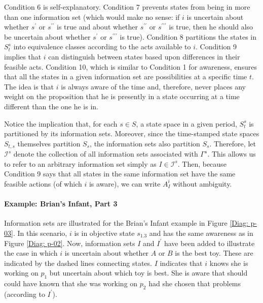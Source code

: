 \documentclass[
11pt,
titlepage,
reqno,
]{article}%
\theoremstyle{definition}
\begin{document}
Condition 6 is self-explanatory. 
Condition 7 prevents states from being in more than one information set (which would make no sense: if $i$ is uncertain about whether $s^{\prime}$ or $s^{\prime\prime}$ is true and about whether $s^{\prime\prime}$ or $s^{\prime\prime\prime}$ is true, then he should also be uncertain about whether $s^{\prime}$ or $s^{\prime\prime\prime}$ is true).
Condition 8  partitions the states in $S^s_{t}$ into equivalence classes according to the acts available to $i$.
Condition 9 implies that $i$ can distinguish between states based upon differences in their feasible acts.
Condition 10, which is similar to Condition 1 for awareness, ensures that all the states in a given information set are possibilities at a specific time $t$.
The idea is that $i$ is always aware of the time and, therefore, never places any weight on the proposition that he is presently in a state occurring at a time different than the one he is in. 


Notice the implication that, for each $s\in S$, a state space in a given period, $S^s_{t}$ is partitioned by its information sets.
Moreover, since the time-stamped state spaces $S_{t,s}$ themselves partition $S_s$, the information sets also partition $S_s$.
Therefore, let $\mathcal{I}^s$ denote the collection of all information sets associated with $\Gamma^s$.
This allows us to refer to an arbitrary information set simply as $I\in\mathcal{I}^s$.
Then, because Condition 9 says that all states in the same information set have the same feasible actions (of which $i$ is aware), we can write $A^i_I$ without ambiguity.
	
\paragraph{Example: Brian's Infant, Part 3}	Information sets are illustrated for the Brian's Infant example in Figure \ref{Diag: p-03}. 
In this scenario, $i$ is in objective state $s_{1.3}$ and has the same awareness as in Figure \ref{Diag: p-02}. 
Now, information sets $I$ and $I^\prime$ have been added to illustrate the case in which $i$ is uncertain about whether $A$ or $B$ is the best toy.
These are indicated by the dashed lines connecting states. 
$I$ indicates that $i$ knows she is working on $p_1$ but uncertain about which toy is best.
She is aware that should could have known that she was working on $p_2$ had she chosen that problems (according to $I^\prime$).
	
\end{document}
